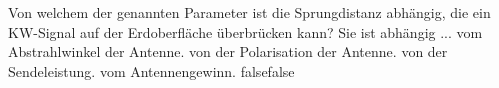     {Von welchem der genannten Parameter ist die Sprungdistanz abhängig, die ein KW-Signal auf der Erdoberfläche überbrücken kann? Sie ist abhängig ...}
    {vom Abstrahlwinkel der Antenne.}
    {von der Polarisation der Antenne.}
    {von der Sendeleistung.}
    {vom Antennengewinn.}
    {false}{false}